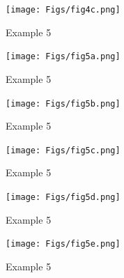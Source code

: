 \documentclass[12pt]{article}
\newcommand{\headsize}{\fontsize{35}{35} \selectfont}
\begin{document}
\vspace{30mm}

\centerline{\texttt{[image: Figs/fig4c.png]}}



\newpage


\headsize \color{yellow}
\hfill \begin{minipage}{5.75in}
\centering
Example 5
\end{minipage}

\vspace{30mm}

\centerline{\texttt{[image: Figs/fig5a.png]}}




\newpage


\headsize \color{yellow}
\hfill \begin{minipage}{5.75in}
\centering
Example 5
\end{minipage}

\vspace{30mm}

\centerline{\texttt{[image: Figs/fig5b.png]}}



\newpage


\headsize \color{yellow}
\hfill \begin{minipage}{5.75in}
\centering
Example 5
\end{minipage}

\vspace{30mm}

\centerline{\texttt{[image: Figs/fig5c.png]}}


\newpage


\headsize \color{yellow}
\hfill \begin{minipage}{5.75in}
\centering
Example 5
\end{minipage}

\vspace{30mm}

\centerline{\texttt{[image: Figs/fig5d.png]}}


\newpage


\headsize \color{yellow}
\hfill \begin{minipage}{5.75in}
\centering
Example 5
\end{minipage}

\vspace{30mm}

\centerline{\texttt{[image: Figs/fig5e.png]}}


\newpage


\headsize \color{yellow}
\hfill \begin{minipage}{5.75in}
\centering
Example 5
\end{minipage}
\end{document}

